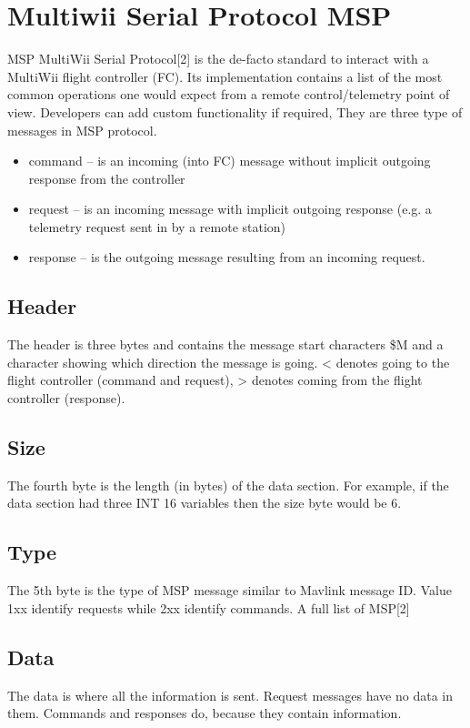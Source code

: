 \cleardoublepage



\section{Multiwii Serial Protocol MSP}

MSP MultiWii Serial Protocol[2] is the de-facto standard to interact with a MultiWii flight controller (FC). Its implementation contains a list of the most common operations one would expect from a remote control/telemetry point of view. Developers can add custom functionality if required,
They are three type of messages in MSP protocol. 
\begin{itemize}
  \item  command – is an incoming (into FC) message without implicit outgoing response from the controller
  \item  request –  is an incoming message with implicit outgoing response (e.g. a telemetry request sent in by a remote station)
  \item  response – is the outgoing message resulting from an incoming request. 
\end{itemize}

\subsection{Header}
The header is three bytes and contains the message start characters \$M and a character showing which direction the message is going. <  denotes going to the flight controller (command and request), > denotes coming from the flight controller (response).

\subsection{Size}
The fourth byte is the length (in bytes) of the data section. For example, if the data section had three INT 16 variables then the size byte would be 6.

\subsection{Type}
The 5th byte is the type of MSP message similar to Mavlink message ID. Value 1xx identify requests while 2xx identify commands.
A full list of MSP[2]

\subsection{Data}
The data is where all the information is sent. Request messages have no data in them. Commands and responses do, because they contain information.

